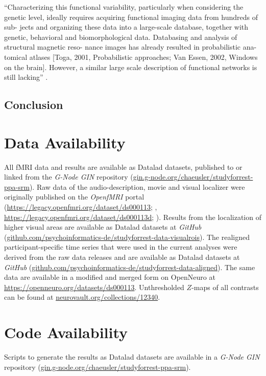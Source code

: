 ``Characterizing this functional variability, particularly when considering the
genetic level, ideally requires acquiring functional imaging data from hundreds
of sub- jects and organizing these data into a large-scale database, together
with genetic, behavioral and biomorphological data. Databasing and analysis of
structural magnetic reso- nance images has already resulted in probabilistic
ana- tomical atlases [Toga, 2001, Probabilistic approaches; Van Essen, 2002,
Windows on the brain]. However, a similar large scale description of
functional networks is still lacking'' \citep{pinel2007fast}.


\subsection{Conclusion}


\section{Data Availability}



All fMRI data and results are available as Datalad \citep{halchenko2021datalad}
datasets, published to or linked from the \emph{G-Node GIN} repository
(\href{https://gin.g-node.org/chaeusler/studyforrest-ppa-srm}{\url{gin.g-node.org/chaeusler/studyforrest-ppa-srm}}).
Raw data of the audio-description, movie and visual localizer were originally
published on the \emph{OpenfMRI} portal
(\url{https://legacy.openfmri.org/dataset/ds000113}; \citep{Hanke2014ds000113},
\space \url{https://legacy.openfmri.org/dataset/ds000113d};
\citep{hanke2016ds000113d}).
Results from the localization of higher visual areas are available as Datalad
datasets at \emph{GitHub}
(\href{https://github.com/psychoinformatics-de/studyforrest-data-visualrois}{\url{github.com/psychoinformatics-de/studyforrest-data-visualrois}}).
The realigned participant-specific time series that were used in the current
analyses were derived from the raw data releases and are available as Datalad
datasets at \emph{GitHub}
(\href{https://github.com/psychoinformatics-de/studyforrest-data-aligned}{\url{github.com/psychoinformatics-de/studyforrest-data-aligned}}).
The same data are available in a modified and merged form on OpenNeuro at
\url{https://openneuro.org/datasets/ds000113}.
Unthresholded $Z$-maps of all contrasts can be found at
\href{https://identifiers.org/neurovault.collection:12340}{\url{neurovault.org/collections/12340}}.


\section*{Code Availability}

Scripts to generate the results as Datalad \citep{halchenko2021datalad} datasets
are available in a \emph{G-Node GIN} repository
(\href{https://gin.g-node.org/chaeusler/studyforrest-ppa-srm}{\url{gin.g-node.org/chaeusler/studyforrest-ppa-srm}}).
